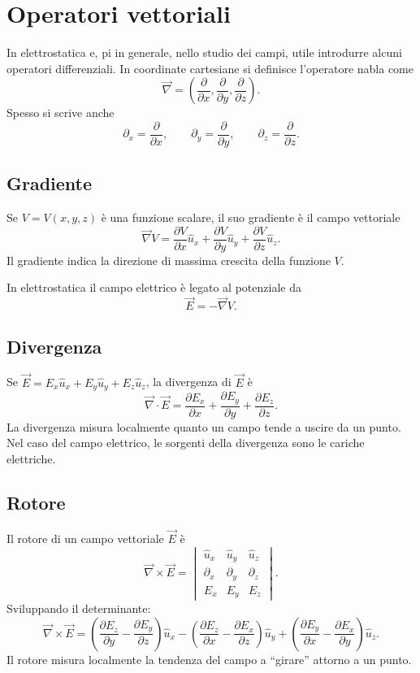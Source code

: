 \documentclass[a4paper]{article}
\begin{document}
\section{Operatori vettoriali}

In elettrostatica e, pi in generale, nello studio dei campi,  utile introdurre alcuni operatori differenziali. In coordinate cartesiane si definisce l'operatore nabla come
\[
    \vec{\nabla}=\left(\frac{\partial}{\partial x},\frac{\partial}{\partial y},\frac{\partial}{\partial z}\right).
\]
Spesso si scrive anche
\[
    \partial_x=\frac{\partial}{\partial x},
    \qquad
    \partial_y=\frac{\partial}{\partial y},
    \qquad
    \partial_z=\frac{\partial}{\partial z}.
\]

\subsection{Gradiente}

Se \(V=V(x,y,z)\) è una funzione scalare, il suo gradiente è il campo vettoriale
\[
    \vec{\nabla}V=\frac{\partial V}{\partial x}\hat{u}_x+\frac{\partial V}{\partial y}\hat{u}_y+\frac{\partial V}{\partial z}\hat{u}_z.
\]
Il gradiente indica la direzione di massima crescita della funzione \(V\).

In elettrostatica il campo elettrico è legato al potenziale da
\[
    \vec{E}=-\vec{\nabla}V.
\]

\subsection{Divergenza}

Se \(\vec{E}=E_x\hat{u}_x+E_y\hat{u}_y+E_z\hat{u}_z\), la divergenza di \(\vec{E}\) è
\[
    \vec{\nabla}\cdot\vec{E}
    =\frac{\partial E_x}{\partial x}+\frac{\partial E_y}{\partial y}+\frac{\partial E_z}{\partial z}.
\]
La divergenza misura localmente quanto un campo tende a uscire da un punto. Nel caso del campo elettrico, le sorgenti della divergenza sono le cariche elettriche.

\subsection{Rotore}

Il rotore di un campo vettoriale \(\vec{E}\) è
\[
    \vec{\nabla}\times\vec{E}
    =
    \begin{vmatrix}
        \hat{u}_x & \hat{u}_y & \hat{u}_z \\
        \partial_x & \partial_y & \partial_z \\
        E_x & E_y & E_z
    \end{vmatrix}.
\]
Sviluppando il determinante:
\[
    \vec{\nabla}\times\vec{E}
    =\left(\frac{\partial E_z}{\partial y}-\frac{\partial E_y}{\partial z}\right)\hat{u}_x
    -\left(\frac{\partial E_z}{\partial x}-\frac{\partial E_x}{\partial z}\right)\hat{u}_y
    +\left(\frac{\partial E_y}{\partial x}-\frac{\partial E_x}{\partial y}\right)\hat{u}_z.
\]
Il rotore misura localmente la tendenza del campo a ``girare'' attorno a un punto.
\end{document}
